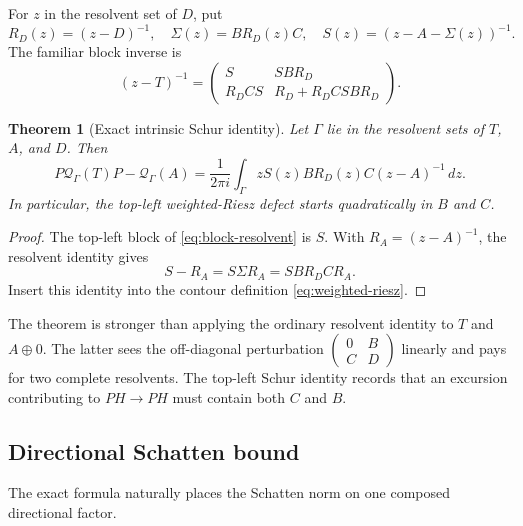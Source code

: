 \documentclass[11pt]{article}
\newtheorem{theorem}{Theorem}[section]
\theoremstyle{definition}
\theoremstyle{remark}
\newcommand{\C}{\mathbb C}
\newcommand{\cQ}{\mathcal Q}
\begin{document}
For $z$ in the resolvent set of $D$, put
\begin{equation}
 R_D(z)=(z-D)^{-1},
 \quad
 \Sigma(z)=BR_D(z)C,
 \quad
 S(z)=(z-A-\Sigma(z))^{-1}.
 \label{eq:schur-objects}
\end{equation}
The familiar block inverse is
\begin{equation}
 (z-T)^{-1}
 =\begin{pmatrix}
 S&SBR_D\\
 R_DCS&R_D+R_DCSBR_D
 \end{pmatrix}.
 \label{eq:block-resolvent}
\end{equation}

\begin{theorem}[Exact intrinsic Schur identity]
\label{thm:exact-schur}
Let $\Gamma$ lie in the resolvent sets of $T$, $A$, and $D$.  Then
\begin{equation}
 P\cQ_\Gamma(T)P-\cQ_\Gamma(A)
 =\frac1{2\pi i}\int_\Gamma
 zS(z)B R_D(z)C(z-A)^{-1}\,dz.
 \label{eq:exact-schur-identity}
\end{equation}
In particular, the top-left weighted-Riesz defect starts quadratically in
$B$ and $C$.
\end{theorem}

\begin{proof}
The top-left block of \eqref{eq:block-resolvent} is $S$.  With
$R_A=(z-A)^{-1}$, the resolvent identity gives
\begin{equation}
 S-R_A=S\Sigma R_A=SBR_DCR_A.
 \label{eq:schur-resolvent-difference}
\end{equation}
Insert this identity into the contour definition
\eqref{eq:weighted-riesz}.
\end{proof}

The theorem is stronger than applying the ordinary resolvent identity to
$T$ and $A\oplus0$.  The latter sees the off-diagonal perturbation
$\left(\begin{smallmatrix}0&B\\C&D\end{smallmatrix}\right)$ linearly and
pays for two complete resolvents.  The top-left Schur identity records that
an excursion contributing to $PH\to PH$ must contain both $C$ and $B$.

\subsection{Directional Schatten bound}

The exact formula naturally places the Schatten norm on one composed
directional factor.
\end{document}
